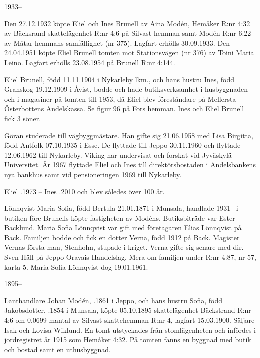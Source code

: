 
 1933--

Den 27.12.1932 köpte Eliel och Ines Brunell av Aina Modén, Hemåker R:nr 4:32 av Bäcksrand skattelägenhet R:nr 4:6 på Silvast hemman samt Modén R:nr 6:22 av Måtar hemmans samfällighet (nr 375). Lagfart erhölls 30.09.1933. Den 24.04.1951 köpte Eliel Brunell tomten mot Stationsvägen (nr 376) av Toini Maria Leino. Lagfart erhölls 23.08.1954 på Brunell R:nr 4:144.

Eliel Brunell, född 11.11.1904 i Nykarleby lkm., och hans hustru Ines, född Granskog 19.12.1909 i Åvist, bodde och hade butiksverksamhet i husbyggnaden och i magasiner på tomten till 1953, då Eliel blev föreståndare på Mellersta Österbottens Andelskassa. Se figur 96 på Fors hemman. Ines och Eliel Brunell fick 3 söner.
\begin{jhchildren}
  \item {}
  \item {}
  \item {}
\end{jhchildren}
Göran studerade till vägbyggmästare. Han gifte sig 21.06.1958 med Lisa Birgitta, född Antfolk 07.10.1935 i Esse. De flyttade till Jeppo 30.11.1960 och flyttade 12.06.1962 till Nykarleby. Viking har undervisat och forskat vid Jyväskylä Universitet. År 1967 flyttade Eliel och Ines till direktörsbostaden i Andelsbankens nya bankhus samt vid pensioneringen 1969 till Nykarleby.

Eliel .1973  -- Ines .2010 och blev således över 100 år.

Lönnqvist Maria Sofia, född Bertula 21.01.1871 i Munsala, handlade 1931-- i butiken före Brunells köpte fastigheten av Modéns. Butiksbiträde var Ester Backlund. Maria Sofia Lönnqvist var gift med företagaren Elias Lönnqvist på Back. Familjen bodde och fick en dotter Verna, född 1912 på Back. Magister Vernas första man, Stenholm, stupade i kriget. Verna gifte sig senare med dir. Sven Häll på Jeppo-Oravais Handelslag. Mera om familjen under R:nr 4:87, nr 57, karta 5. Maria Sofia Lönnqvist dog 19.01.1961.


 1895--

Lanthandlare Johan Modén, .1861 i Jeppo, och hans hustru Sofia, född Jakobsdotter, .1854 i Munsala, köpte 05.10.1895 skattelägenhet Bäckstrand R:nr 4:6 om 0,0699 mantal av Silvast skattehemman R:nr 4, lagfart 15.03.1900. Säljare Isak och Lovisa Wiklund. En tomt utstyckades från stomlägenheten och infördes i jordregistret år 1915 som Hemåker 4:32. På tomten fanns en byggnad med butik och bostad samt en uthusbyggnad.

